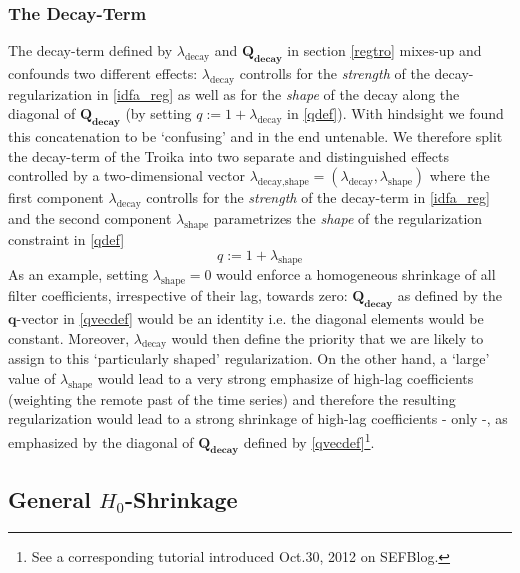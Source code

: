 \documentclass[11pt]{article}
\begin{document}
\subsubsection{The Decay-Term}\label{decayterm}

The decay-term defined by $\lambda_{\textrm{decay}}$ and $\mathbf{Q_{decay}}$  in section \ref{regtro} mixes-up and confounds two different effects: $\lambda_{\textrm{decay}}$ controlls for the \emph{strength} of the decay-regularization in \ref{idfa_reg} as well as for the \emph{shape} of the decay along the diagonal of $\mathbf{Q_{decay}}$ (by setting $q:=1+\lambda_{\textrm{decay}}$ in \ref{qdef}). With hindsight we found this concatenation to be `confusing' and in the end untenable. We therefore split the decay-term of the Troika into two separate and distinguished effects controlled by a two-dimensional vector \boldmath$\lambda_{\textrm{decay},\textrm{shape}}$\unboldmath$=(\lambda_{\textrm{decay}},\lambda_{\textrm{shape}})$ where the first component $\lambda_{\textrm{decay}}$ controlls for the \emph{strength} of the decay-term in \ref{idfa_reg} and the second component $\lambda_{\textrm{shape}}$ parametrizes the \emph{shape} of the regularization constraint in \ref{qdef}
\begin{equation}\label{qdef}
q:=1+\lambda_{\textrm{shape}}
\end{equation}
As an example, setting $\lambda_{\textrm{shape}}=0$ would enforce a homogeneous shrinkage of all filter coefficients, irrespective of their lag, towards zero: $\mathbf{Q_{decay}}$ as defined by the $\mathbf{q}$-vector in \ref{qvecdef} would be an identity i.e. the diagonal elements would be constant. Moreover,  $\lambda_{\textrm{decay}}$ would then define the priority that we are likely to assign to this `particularly shaped' regularization. On the other hand, a `large' value of  $\lambda_{\textrm{shape}}$ would lead to a very strong emphasize of high-lag coefficients (weighting the remote past of the time series) and therefore the resulting regularization would lead to a strong shrinkage of high-lag coefficients - only -, as emphasized by the diagonal of $\mathbf{Q_{decay}}$ defined by \ref{qvecdef}\footnote{See a corresponding tutorial introduced Oct.30, 2012 on SEFBlog.}.



\subsection{General $H_0$-Shrinkage}\label{zeroshrink}
\end{document}
